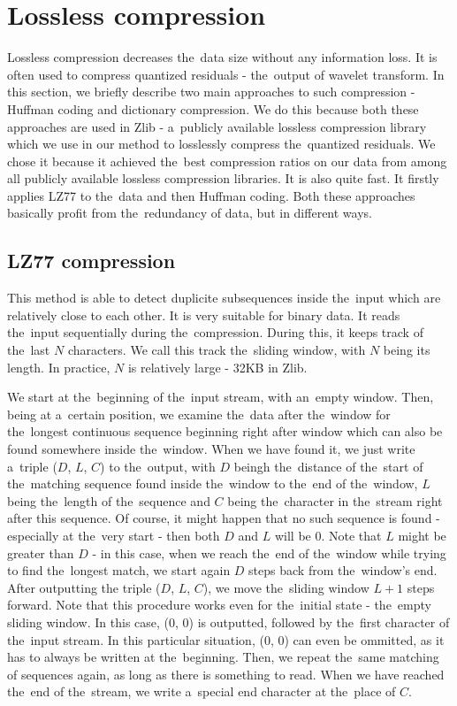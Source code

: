 \section{Lossless compression}\label{sec:lossless_comp}

Lossless compression decreases the~data size without any information loss. It is often used to compress quantized residuals - the~output of wavelet transform. In this section, we briefly describe two main approaches to such compression - Huffman coding and dictionary compression. We do this because both these approaches are used in Zlib - a~publicly available lossless compression library which we use in our method to losslessly compress the~quantized residuals. We chose it because it achieved the~best compression ratios on our data from among all publicly available lossless compression libraries. It is also quite fast. It firstly applies LZ77 to the~data and then Huffman coding. Both these approaches basically profit from the~redundancy of data, but in different ways.

\subsection{LZ77 compression}\label{subsec:lz77}

This method is able to detect duplicite subsequences inside the~input which are relatively close to each other. It is very suitable for binary data. It reads the~input sequentially during the~compression. During this, it keeps track of the~last $N$ characters. We call this track the~sliding window, with $N$ being its length. In practice, $N$ is relatively large - 32KB in Zlib. 

We start at the~beginning of the~input stream, with an~empty window. Then, being at a~certain position, we examine the~data after the~window for the~longest continuous sequence beginning right after window which can also be found somewhere inside the~window. When we have found it, we just write a~triple ($D$, $L$, $C$) to the~output, with $D$ beingh the~distance of the~start of the~matching sequence found inside the~window to the~end of the~window, $L$ being the~length of the~sequence and $C$ being the~character in the~stream right after this sequence. Of course, it might happen that no such sequence is found - especially at the~very start - then both $D$ and $L$ will be 0. Note that $L$ might be greater than $D$ - in this case, when we reach the~end of the~window while trying to find the~longest match, we start again $D$ steps back from the~window's end. After outputting the triple ($D$, $L$, $C$), we move the~sliding window $L + 1$ steps forward. Note that this procedure works even for the~initial state - the~empty sliding window. In this case, (0, 0) is outputted, followed by the~first character of the~input stream. In this particular situation, (0, 0) can even be ommitted, as it has to always be written at the~beginning. Then, we repeat the~same matching of sequences again, as long as there is something to read. When we have reached the~end of the~stream, we write a~special end character at the~place of $C$.

